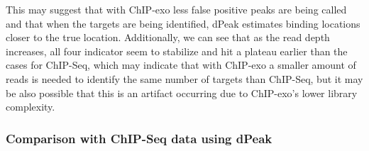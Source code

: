 \documentclass{bmcart}\usepackage[]{graphicx}\usepackage[]{color}
\newcommand{\sig}{\sigma^{70}}
\begin{document}
This may suggest that with ChIP-exo less false positive peaks are
being called and that when the targets are being identified, dPeak
estimates binding locations closer to the true location. Additionally,
we can see that as the read depth increases, all four indicator seem
to stabilize and hit a plateau earlier than the cases for ChIP-Seq,
which may indicate that with ChIP-exo a smaller amount of reads is
needed to identify the same number of targets than ChIP-Seq, but it
may be also possible that this is an artifact occurring due to
ChIP-exo's lower library complexity. 


\subsubsection*{Comparison with ChIP-Seq data using dPeak}
\end{document}
